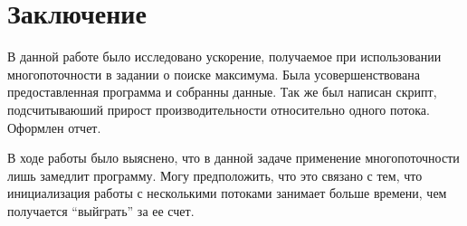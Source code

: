 \documentclass[a4paper, 12pt]{article}
\begin{document}




\section{Заключение}

В данной работе было исследовано ускорение, получаемое при использовании многопоточности в задании о поиске максимума.
Была усовершенствована предоставленная программа и собранны данные.
Так же был написан скрипт, подсчитываюший прирост производительности относительно одного потока.
Оформлен отчет.

В ходе работы было выяснено, что в данной задаче применение многопоточности лишь замедлит программу.
Могу предположить, что это связано с тем, что инициализация работы с несколькими потоками занимает больше времени, чем получается ``выйграть'' за ее счет.


\end{document}
